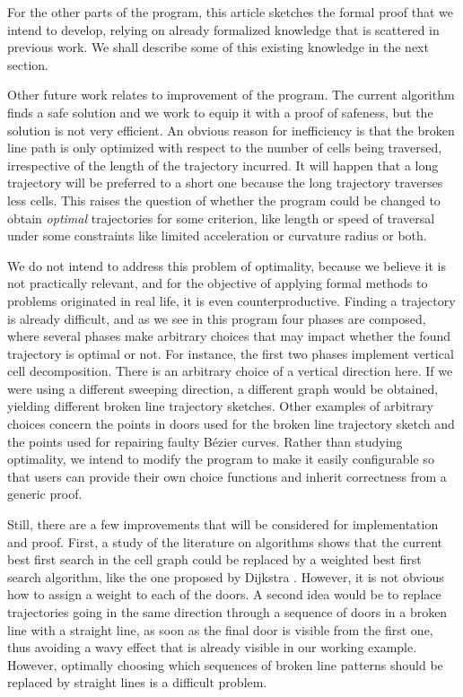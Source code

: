 \documentclass{easychair}
\begin{document}
For the other parts of the program, this article sketches the formal
proof that we intend to develop, relying on already formalized
knowledge that is scattered in previous work.  We shall describe some
of this existing knowledge in the next section.

Other future work relates to improvement of the program.  The current
algorithm finds a safe solution and we work to equip it with a proof
of safeness, but the solution is not very efficient.  An obvious
reason for inefficiency is that the broken line path is only optimized
with respect to the number of cells being traversed, irrespective of
the length of the trajectory incurred.  It will happen that a long
trajectory will be preferred to a short one because the long
trajectory traverses less cells.   This raises the question of whether
the program could be changed to obtain {\em optimal} trajectories for
some criterion, like length or speed of traversal under some
constraints like limited acceleration or curvature radius or both.

We do not intend to address this problem of optimality, because we
believe it is not practically relevant, and for the objective of
applying formal methods to problems originated in real life, it is
even counterproductive.  Finding a trajectory is already difficult,
and as we see in this program four phases are composed, where several
phases make arbitrary choices that may impact whether the found
trajectory is optimal or not.  For
instance, the first two phases implement vertical cell decomposition.
There is an arbitrary choice of a vertical direction here.  If we were
using a different sweeping direction, a different graph would be
obtained, yielding different broken line trajectory sketches.
Other examples of arbitrary choices concern the points in doors used
for the broken line trajectory sketch and the points used for repairing
faulty Bézier curves.  Rather than studying optimality, we intend to
modify the program to make it easily configurable so that users can
provide their own choice functions and inherit correctness from a
generic proof.

Still, there are a few improvements that will be considered for
implementation and proof.  First, a study of the literature on
algorithms shows that the current best first search in the cell graph
could be replaced by a weighted best first search algorithm, like the
one proposed by Dijkstra \cite{Dijkstra1959}.  However, it is not
obvious how to assign a weight to each of the doors.  A second idea
would be to replace trajectories going in the same direction through a
sequence of doors in a broken line with a straight line, as soon as
the final door is visible from the first one, thus avoiding a wavy
effect that is already visible in our working example.
However, optimally choosing which sequences of broken line patterns
should be replaced by straight lines is a difficult problem.
\end{document}
